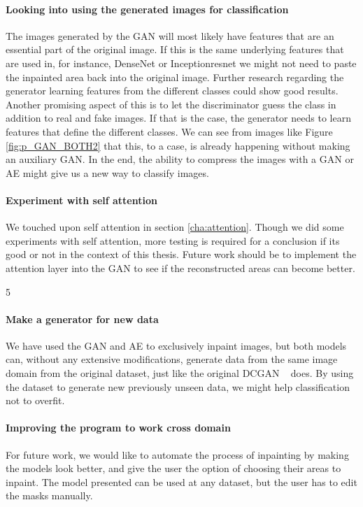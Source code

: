 \paragraph{Looking into using the generated images for classification}
The images generated by the GAN will most likely have features that are an essential part of the original image. If this is the same underlying features that are used in, for instance, DenseNet or Inceptionresnet we might not need to paste the inpainted area back into the original image.
Further research regarding the generator learning features from the different classes could show good results.
Another promising aspect of this is to let the discriminator guess the class in addition to real and fake images. If that is the case, the generator needs to learn features that define the different classes. We can see from images like Figure \ref{fig:p_GAN_BOTH2} that this, to a case, is already happening without making an auxiliary GAN.
In the end, the ability to compress the images with a GAN or AE might give us a new way to classify images.

\paragraph{Experiment with self attention}
We touched upon self attention in section \ref{cha:attention}. Though we did some experiments with self attention, more testing is required for a conclusion if its good or not in the context of this thesis. Future work should be to implement the attention layer into the GAN to see if the reconstructed areas can become better. 

5%

\paragraph{Make a generator for new data}
We have used the GAN and AE to exclusively inpaint images, but both models can, without any extensive modifications,  generate data from the same image domain from the original dataset, just like the original DCGAN ~\cite{DBLP:journals/corr/RadfordMC15} does.  
By using the dataset to generate new previously unseen data, we might help classification not to overfit.

\paragraph{Improving the program to work cross domain}
For future work, we would like to automate the process of inpainting by making the models look better, and give the user the option of choosing their areas to inpaint. The model presented can be used at any dataset, but the user has to edit the masks manually. 

